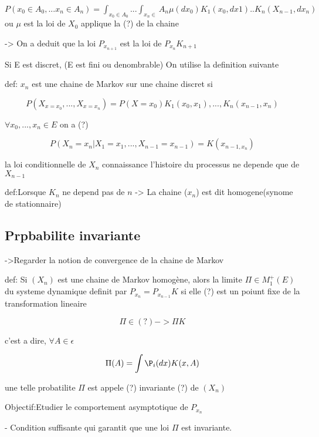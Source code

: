 \documentclass{article}
\begin{document}
$P(x_0 \in A_0, ... x_n \in A_n)=\int_{x_0\in A_0} ... \int_{x_n \in }A_n \mu(d x_0)K_1(x_0,dx1) .. K_n(X_{n-1},dx_n)$
ou $\mu$ est la loi de $X_0$ applique la (?) de la chaine

-> On a deduit que la loi $P_{x_{n+1}}$ est la loi de $P_{x_n}K_{n+1}$

Si E est discret, (E est fini ou denombrable)
On utilise la definition suivante

def: $x_n$ est une chaine de Markov sur une chaine discret si 

\begin{equation}
P(X_{x=x_0},...,X_{x=x_n})=P(X=x_0)K_1(x_0, x_1),..., K_n(x_{n-1},x_n)
\end{equation}

$\forall x_0,...,x_n \in E$
on a (?)

\begin{equation}
P(X_n=x_n|X_1=x_1,...,X_{n-1}=x_{n-1})=K(x_{n-1,x_n})
\end{equation}

la loi conditionnelle de $X_n$ connaissance l'histoire du processus ne depende que de $X_{n-1}$

def:Lorsque $K_n$ ne depend pas de $n$ -> La chaine ($x_n$) est dit homogene(synome de stationnaire)

\subsection{Prpbabilite invariante}

->Regarder la notion de convergence de la chaine de Markov

def: Si $(X_n)$ est une chaine de Markov homog\`ene, alors la limite $\Pi \in M_1^+(E)$ du systeme dynamique definit par 
$P_{x_n}=P_{x_{n-1}}K$  si elle (?) est un poiunt fixe de la transformation lineaire

\begin{equation}
\Pi \in (?) -> \Pi K
\end{equation}

c'est a dire, $\forall A \in \epsilon$

\begin{equation}
\Pi(A)=\int \P_i(dx)K(x,A)
\end{equation}

une telle probatilite $\Pi$ est appele (?) invariante (?) de $(X_n)$

Objectif:Etudier le comportement asymptotique de $P_{x_n}$

- Condition suffisante qui garantit que une loi $\Pi$ est invariante.
\end{document}
